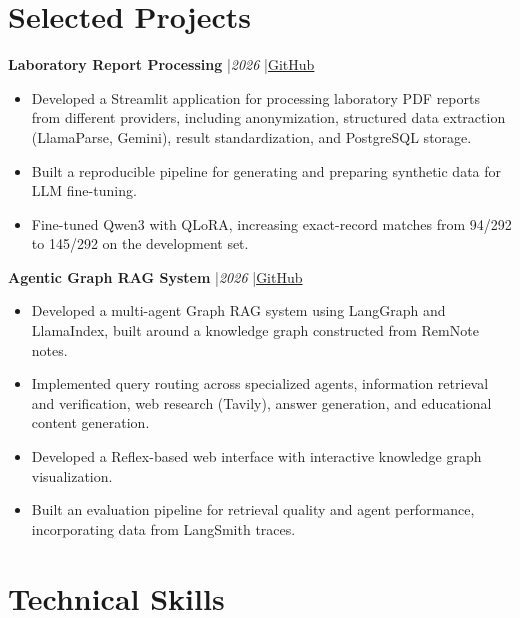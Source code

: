 \documentclass[12pt]{article}
\begin{document}
\newpage

\section*{Selected Projects}
\vspace{3pt}

\textbf{Laboratory Report Processing}
\enspace|\enspace\textit{2026}
\enspace|\enspace\href{https://github.com/KseniaGu/healthcare-assistant}
    {\textcolor{blue!65!black}{GitHub}}
\begin{itemize}
  \item Developed a Streamlit application for processing laboratory PDF reports from different providers, including anonymization, structured data extraction (LlamaParse, Gemini), result standardization, and PostgreSQL storage.
  \item Built a reproducible pipeline for generating and preparing synthetic data for LLM fine-tuning.
  \item Fine-tuned Qwen3 with QLoRA, increasing exact-record matches from 94/292 to 145/292 on the development set.
\end{itemize}

\vspace{3pt}
\textbf{Agentic Graph RAG System}
\enspace|\enspace\textit{2026}
\enspace|\enspace\href{https://github.com/KseniaGu/remnote-graph-rag}
    {\textcolor{blue!65!black}{GitHub}}
\begin{itemize}
    \item Developed a multi-agent Graph RAG system using LangGraph and LlamaIndex, built around a knowledge graph constructed from RemNote notes.
    \item Implemented query routing across specialized agents, information retrieval and verification, web research (Tavily), answer generation, and educational content generation.
    \item Developed a Reflex-based web interface with interactive knowledge graph visualization.
    \item Built an evaluation pipeline for retrieval quality and agent performance, incorporating data from LangSmith traces.
\end{itemize}
\vspace{2pt}

\section*{Technical Skills}
\vspace{3pt}
\end{document}

